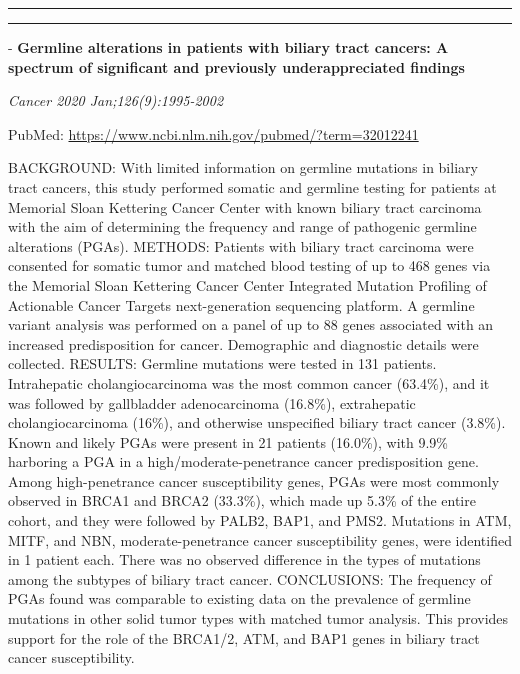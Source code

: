 \documentclass[
]{article}
\begin{document}
\begin{center}\rule{0.5\linewidth}{0.5pt}\end{center}

\begin{center}\rule{0.5\linewidth}{0.5pt}\end{center}

- \textbf{Germline alterations in patients with biliary tract cancers: A
spectrum of significant and previously underappreciated findings}

\emph{Cancer 2020 Jan;126(9):1995-2002}

PubMed: \url{https://www.ncbi.nlm.nih.gov/pubmed/?term=32012241}

BACKGROUND: With limited information on germline mutations in biliary
tract cancers, this study performed somatic and germline testing for
patients at Memorial Sloan Kettering Cancer Center with known biliary
tract carcinoma with the aim of determining the frequency and range of
pathogenic germline alterations (PGAs). METHODS: Patients with biliary
tract carcinoma were consented for somatic tumor and matched blood
testing of up to 468 genes via the Memorial Sloan Kettering Cancer
Center Integrated Mutation Profiling of Actionable Cancer Targets
next-generation sequencing platform. A germline variant analysis was
performed on a panel of up to 88 genes associated with an increased
predisposition for cancer. Demographic and diagnostic details were
collected. RESULTS: Germline mutations were tested in 131 patients.
Intrahepatic cholangiocarcinoma was the most common cancer (63.4\%), and
it was followed by gallbladder adenocarcinoma (16.8\%), extrahepatic
cholangiocarcinoma (16\%), and otherwise unspecified biliary tract
cancer (3.8\%). Known and likely PGAs were present in 21 patients
(16.0\%), with 9.9\% harboring a PGA in a high/moderate-penetrance
cancer predisposition gene. Among high-penetrance cancer susceptibility
genes, PGAs were most commonly observed in BRCA1 and BRCA2 (33.3\%),
which made up 5.3\% of the entire cohort, and they were followed by
PALB2, BAP1, and PMS2. Mutations in ATM, MITF, and NBN,
moderate-penetrance cancer susceptibility genes, were identified in 1
patient each. There was no observed difference in the types of mutations
among the subtypes of biliary tract cancer. CONCLUSIONS: The frequency
of PGAs found was comparable to existing data on the prevalence of
germline mutations in other solid tumor types with matched tumor
analysis. This provides support for the role of the BRCA1/2, ATM, and
BAP1 genes in biliary tract cancer susceptibility.
\end{document}
